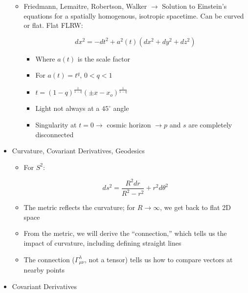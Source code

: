 \begin{itemize}
\begin{itemize}
      \item Friedmann, Lemaitre, Robertson, Walker $\to$ Solution to Einstein's equations for a spatially homogenous, isotropic spacetime. Can be curved or flat. Flat FLRW:

        $$dx^2=-dt^2+a^2(t)(dx^2+dy^2+dz^2)$$

        \begin{itemize}

          \item Where $a(t)$ is the scale factor

          \item For $a(t)=t^q$, $0<q<1$

          \item $t=(1-q)^{\frac{1}{1-q}}(\pm x-x_o)^{\frac{1}{1-q}}$

          \item Light not always at a $45^{\circ}$ angle

          \item Singularity at $t=0\to$ cosmic horizon $\to p$ and $s$ are completely disconnected

        \end{itemize}

    \end{itemize}

  \item Curvature, Covariant Derivatives, Geodesics

    \begin{itemize}

      \item For $S^2$:

        $$ds^2=\frac{R^2dr}{R^2-r^2}+r^2d\theta^2$$

      \item The metric reflects the curvature; for $R\to\infty$, we get back to flat 2D space

      \item From the metric, we will derive the ``connection,'' which tells us the impact of curvature, including defining straight lines

      \item The connection ($\Gamma^{\lambda}_{\mu\nu}$, not a tensor) tells us how to compare vectors at nearby points
        
    \end{itemize}

  \item Covariant Derivatives


\end{itemize}
